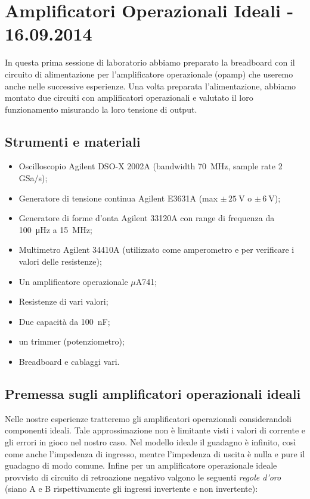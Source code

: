 \section{Amplificatori Operazionali Ideali - 16.09.2014}

In questa prima sessione di laboratorio abbiamo preparato la breadboard con il circuito di alimentazione per l'amplificatore operazionale (opamp) che useremo anche nelle successive esperienze.
Una volta preparata l'alimentazione, abbiamo montato due circuiti con amplificatori operazionali e valutato il loro funzionamento misurando la loro tensione di output.

\subsection{Strumenti e materiali}

\begin{itemize} [noitemsep]
\item Oscilloscopio Agilent DSO-X 2002A (bandwidth \SI{70}{\mega\hertz}, sample rate \num{2} GSa/s);
\item Generatore di tensione continua Agilent E3631A (max $\pm \, \SI{25}{\volt}$ o $\pm \, \SI{6}{\volt}$);
\item Generatore di forme d'onta Agilent 33120A con range di frequenza da \SI{100}{\micro\hertz} a \SI{15}{\mega\hertz};
\item Multimetro Agilent 34410A (utilizzato come amperometro e per verificare i valori delle resistenze);
\item Un amplificatore operazionale $\mu$A741;
\item Resistenze di vari valori;
\item Due capacità da \SI{100}{\nano\farad};
\item un trimmer (potenziometro);
\item Breadboard e cablaggi vari.
\end{itemize}

\subsection{Premessa sugli amplificatori operazionali ideali}

Nelle nostre esperienze tratteremo gli amplificatori operazionali considerandoli componenti ideali. Tale approssimazione non è limitante visti i valori di corrente e gli errori in gioco nel nostro caso.
Nel modello ideale il guadagno è infinito, così come anche l'impedenza di ingresso, mentre l'impedenza di uscita è nulla e pure il guadagno di modo comune.
Infine per un amplificatore operazionale ideale provvisto di circuito di retroazione negativo valgono le seguenti \textit{regole d'oro} (siano A e B rispettivamente gli ingressi invertente e non invertente):

